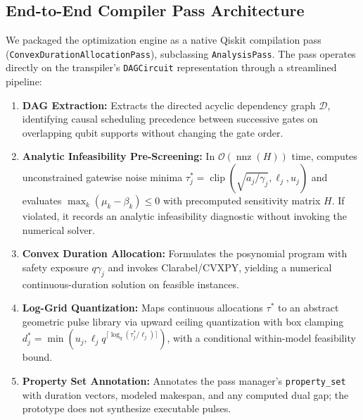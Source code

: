 \documentclass[10pt,letterpaper,journal]{IEEEtran}
\begin{document}
\subsection{End-to-End Compiler Pass Architecture}
We packaged the optimization engine as a native Qiskit \cite{qiskit2024} compilation pass (\texttt{ConvexDurationAllocationPass}), subclassing \texttt{AnalysisPass}. The pass operates directly on the transpiler's \texttt{DAGCircuit} representation through a streamlined pipeline:
\begin{enumerate}
\item \textbf{DAG Extraction:} Extracts the directed acyclic dependency graph $\mathcal{D}$, identifying causal scheduling precedence between successive gates on overlapping qubit supports without changing the gate order.
\item \textbf{Analytic Infeasibility Pre-Screening:} In $\mathcal{O}(\operatorname{nnz}(H))$ time, computes unconstrained gatewise noise minima $\tau_j^* = \operatorname{clip}(\sqrt{a_j/\gamma_j}, \ell_j, u_j)$ and evaluates $\max_k (\mu_k - \beta_k) \le 0$ with precomputed sensitivity matrix $H$. If violated, it records an analytic infeasibility diagnostic without invoking the numerical solver.
\item \textbf{Convex Duration Allocation:} Formulates the posynomial program with safety exposure $q\gamma_j$ and invokes Clarabel/CVXPY, yielding a numerical continuous-duration solution on feasible instances.
\item \textbf{Log-Grid Quantization:} Maps continuous allocations $\tau^*$ to an abstract geometric pulse library via upward ceiling quantization with box clamping $d_j^* = \min(u_j, \ell_j q^{\lceil \log_q (\tau_j^* / \ell_j) \rceil})$, with a conditional within-model feasibility bound.
\item \textbf{Property Set Annotation:} Annotates the pass manager's \texttt{property\_set} with duration vectors, modeled makespan, and any computed dual gap; the prototype does not synthesize executable pulses.
\end{enumerate}
\end{document}
